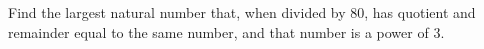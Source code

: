 Find the largest natural number that, when divided by $80$, has quotient and remainder equal to the same number, and that number is a power of $3$.
